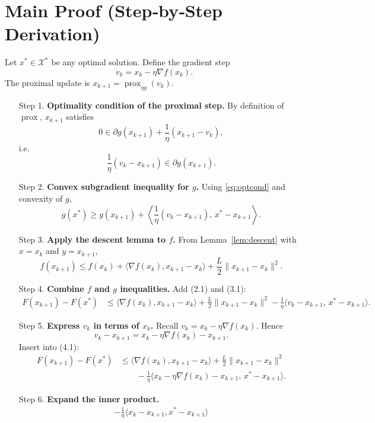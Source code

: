 \documentclass{article}
\newcommand{\prox}{\operatorname{prox}}
\begin{document}
\section*{Main Proof (Step‑by‑Step Derivation)}
Let $x^{*}\in\mathcal{X}^{*}$ be any optimal solution. Define the gradient step
\[
v_{k}=x_{k}-\eta\nabla f(x_{k}) .
\]
The proximal update is $x_{k+1}= \prox_{\eta g}(v_{k})$.

\begin{enumerate}
\item[Step 1.] \textbf{Optimality condition of the proximal step.}  
By definition of $\prox$, $x_{k+1}$ satisfies
\[
0 \in \partial g(x_{k+1})+\frac{1}{\eta}(x_{k+1}-v_{k}),
\]
i.e.
\begin{equation}
\label{eq:optcond}
\frac{1}{\eta}(v_{k}-x_{k+1})\in\partial g(x_{k+1}).
\end{equation}
\item[Step 2.] \textbf{Convex subgradient inequality for $g$.}  
Using \eqref{eq:optcond} and convexity of $g$,
\[
g(x^{*})\ge g(x_{k+1})+\left\langle \frac{1}{\eta}(v_{k}-x_{k+1}),\,x^{*}-x_{k+1}\right\rangle .
\tag{2.1}
\]
\item[Step 3.] \textbf{Apply the descent lemma to $f$.}  
From Lemma~\ref{lem:descent} with $x=x_{k}$ and $y=x_{k+1}$,
\[
f(x_{k+1})\le f(x_{k})+\langle\nabla f(x_{k}),x_{k+1}-x_{k}\rangle+\frac{L}{2}\|x_{k+1}-x_{k}\|^{2}.
\tag{3.1}
\]
\item[Step 4.] \textbf{Combine $f$ and $g$ inequalities.}  
Add (2.1) and (3.1):
\[
\begin{aligned}
F(x_{k+1})-F(x^{*})
&\le \langle\nabla f(x_{k}),x_{k+1}-x_{k}\rangle
   +\frac{L}{2}\|x_{k+1}-x_{k}\|^{2}
   -\frac{1}{\eta}\langle v_{k}-x_{k+1},\,x^{*}-x_{k+1}\rangle .
\end{aligned}
\tag{4.1}
\]
\item[Step 5.] \textbf{Express $v_{k}$ in terms of $x_{k}$.}  
Recall $v_{k}=x_{k}-\eta\nabla f(x_{k})$. Hence
\[
v_{k}-x_{k+1}=x_{k}-\eta\nabla f(x_{k})-x_{k+1}.
\]
Insert into (4.1):
\[
\begin{aligned}
F(x_{k+1})-F(x^{*})
&\le \langle\nabla f(x_{k}),x_{k+1}-x_{k}\rangle
   +\frac{L}{2}\|x_{k+1}-x_{k}\|^{2}\\
&\qquad -\frac{1}{\eta}\langle x_{k}-\eta\nabla f(x_{k})-x_{k+1},\,x^{*}-x_{k+1}\rangle .
\end{aligned}
\tag{5.1}
\]
\item[Step 6.] \textbf{Expand the inner product.}  
\[
\begin{aligned}
-\frac{1}{\eta}\langle x_{k}-x_{k+1},x^{*}-x_{k+1}\rangle

\end{aligned}\]
\end{enumerate}
\end{document}
